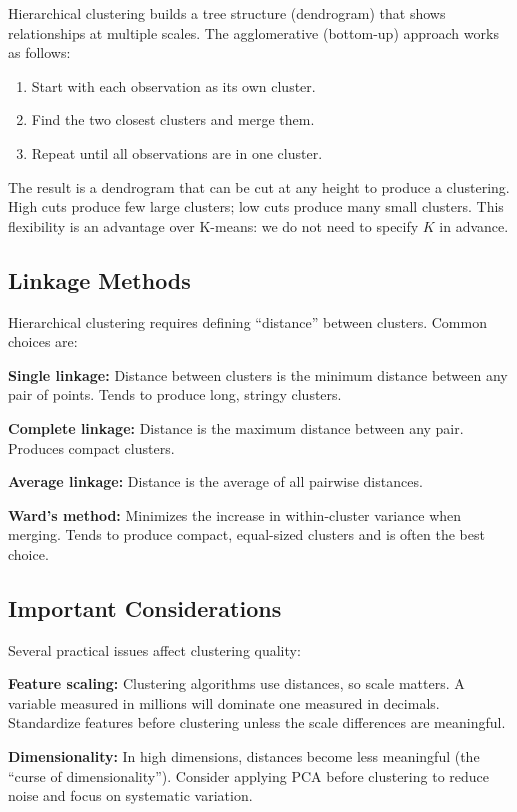 \documentclass[11pt,a4paper]{article}
\begin{document}
Hierarchical clustering builds a tree structure (dendrogram) that shows relationships at multiple scales. The agglomerative (bottom-up) approach works as follows:

\begin{enumerate}
    \item Start with each observation as its own cluster.
    \item Find the two closest clusters and merge them.
    \item Repeat until all observations are in one cluster.
\end{enumerate}

The result is a dendrogram that can be cut at any height to produce a clustering. High cuts produce few large clusters; low cuts produce many small clusters. This flexibility is an advantage over K-means: we do not need to specify $K$ in advance.

\subsection{Linkage Methods}

Hierarchical clustering requires defining ``distance'' between clusters. Common choices are:

\textbf{Single linkage:} Distance between clusters is the minimum distance between any pair of points. Tends to produce long, stringy clusters.

\textbf{Complete linkage:} Distance is the maximum distance between any pair. Produces compact clusters.

\textbf{Average linkage:} Distance is the average of all pairwise distances.

\textbf{Ward's method:} Minimizes the increase in within-cluster variance when merging. Tends to produce compact, equal-sized clusters and is often the best choice.

\subsection{Important Considerations}

Several practical issues affect clustering quality:

\textbf{Feature scaling:} Clustering algorithms use distances, so scale matters. A variable measured in millions will dominate one measured in decimals. Standardize features before clustering unless the scale differences are meaningful.

\textbf{Dimensionality:} In high dimensions, distances become less meaningful (the ``curse of dimensionality''). Consider applying PCA before clustering to reduce noise and focus on systematic variation.
\end{document}
